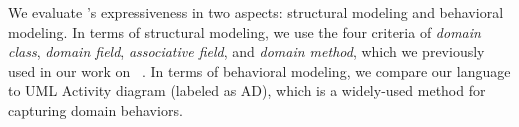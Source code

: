 We evaluate \agldcsl’s expressiveness in two aspects: structural modeling and behavioral modeling. In terms of structural modeling, we use the four criteria of \textit{domain class}, \textit{domain field}, \textit{associative field}, and \textit{domain method}, which we previously used in our work on \dcsl~\cite{le_domain_2018}. In terms of behavioral modeling, we compare our language to UML Activity diagram (labeled as AD), which is a widely-used method for capturing domain behaviors.



